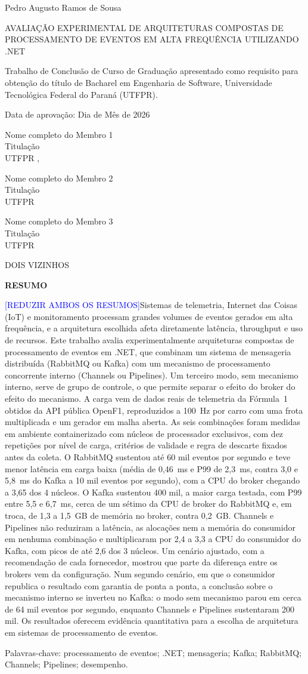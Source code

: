 \documentclass[12pt]{article}
\newcommand{\todoe}[1]{\textcolor{blue}{[#1]}}
\newcommand{\autor}{Pedro Augusto Ramos de Sousa}
\newcommand{\titulo}{Avaliação Experimental de Arquiteturas Compostas de Processamento de Eventos em Alta Frequência Utilizando .NET}
\newcommand{\tituloUppercase}{\MakeUppercase{\titulo}}
\newcommand{\textoResumo}{\todoe{REDUZIR AMBOS OS RESUMOS}Sistemas de telemetria, Internet das Coisas (IoT) e monitoramento processam grandes volumes de eventos gerados em alta frequência, e a arquitetura escolhida afeta diretamente latência, throughput e uso de recursos. Este trabalho avalia experimentalmente arquiteturas compostas de processamento de eventos em .NET, que combinam um sistema de mensageria distribuída (RabbitMQ ou Kafka) com um mecanismo de processamento concorrente interno (Channels ou Pipelines). Um terceiro modo, sem mecanismo interno, serve de grupo de controle, o que permite separar o efeito do broker do efeito do mecanismo. A carga vem de dados reais de telemetria da Fórmula~1 obtidos da API pública OpenF1, reproduzidos a 100~Hz por carro com uma frota multiplicada e um gerador em malha aberta. As seis combinações foram medidas em ambiente containerizado com núcleos de processador exclusivos, com dez repetições por nível de carga, critérios de validade e regra de descarte fixados antes da coleta. O RabbitMQ sustentou até 60 mil eventos por segundo e teve menor latência em carga baixa (média de 0,46~ms e P99 de 2,3~ms, contra 3,0 e 5,8~ms do Kafka a 10 mil eventos por segundo), com a CPU do broker chegando a 3,65 dos 4 núcleos. O Kafka sustentou 400 mil, a maior carga testada, com P99 entre 5,5 e 6,7~ms, cerca de um sétimo da CPU de broker do RabbitMQ e, em troca, de 1,3 a 1,5~GB de memória no broker, contra 0,2~GB. Channels e Pipelines não reduziram a latência, as alocações nem a memória do consumidor em nenhuma combinação e multiplicaram por 2,4 a 3,3 a CPU do consumidor do Kafka, com picos de até 2,6 dos 3 núcleos. Um cenário ajustado, com a recomendação de cada fornecedor, mostrou que parte da diferença entre os brokers vem da configuração. Num segundo cenário, em que o consumidor republica o resultado com garantia de ponta a ponta, a conclusão sobre o mecanismo interno se inverteu no Kafka: o modo sem mecanismo parou em cerca de 64 mil eventos por segundo, enquanto Channels e Pipelines sustentaram 200 mil. Os resultados oferecem evidência quantitativa para a escolha de arquitetura em sistemas de processamento de eventos.}
\newcommand{\datadeaprovacao}{Dia de Mês de 2026}
\newcommand{\ano}{\the\year{}}
\newcommand{\membroUm}{Nome completo do Membro 1}
\newcommand{\titulacaoMembroUm}{Titulação}
\newcommand{\instituicaoMembroUm}{UTFPR}
\newcommand{\membroDois}{Nome completo do Membro 2}
\newcommand{\titulacaoMembroDois}{Titulação}
\newcommand{\instituicaoMembroDois}{UTFPR}
\newcommand{\membroTres}{Nome completo do Membro 3}
\newcommand{\titulacaoMembroTres}{Titulação}
\newcommand{\instituicaoMembroTres}{UTFPR}
\begin{document}
\begin{titlepage}
\centering
{\large \autor \par}
\vspace{1.5cm}
{\large \tituloUppercase \par}
\vspace{2cm}
\hfill
\parbox[t]{8cm}{
Trabalho de Conclusão de Curso de Graduação apresentado como requisito para obtenção do
título de Bacharel em Engenharia de Software, Universidade Tecnológica Federal do Paraná
(UTFPR). \par
}

\vspace{1.5cm}
{Data de aprovação: \datadeaprovacao \par}
\vspace{1.5cm}
\hrulefill
\vspace{-0.3cm}

{\membroUm}\\
{\titulacaoMembroUm}\\
{\instituicaoMembroUm}
\vspace{1cm},

\hrulefill
\vspace{-0.3cm}

{\membroDois}\\
{\titulacaoMembroDois}\\
{\instituicaoMembroDois}\\
\vspace{1cm}

\hrulefill
\vspace{-0.3cm}

{\membroTres}\\
{\titulacaoMembroTres}\\
{\instituicaoMembroTres}\\

\vspace*{\fill}
{\large DOIS VIZINHOS \par}
{\large \ano \par}
\end{titlepage}

\newpage
\pagestyle{empty}

\centering
{\textbf{RESUMO} \par}
\vspace{1cm}
\justifying
\noindent
\textoResumo

\noindent
Palavras-chave: processamento de eventos; .NET; mensageria; Kafka; RabbitMQ; Channels; Pipelines; desempenho.
\vspace{1cm}
\end{document}
